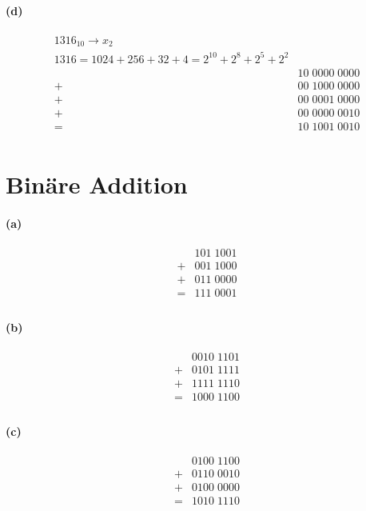 \documentclass[a4paper]{article}
\begin{document}
\paragraph{(d)}
\begin{align*}
    1316_{10}\rightarrow x_2\\
    1316 = 1024+256+32+4=2^{10}+2^8+2^5+2^2\\
    &10\;0000\;0000\\
    +&00\;1000\;0000\\
    +&00\;0001\;0000\\
    +&00\;0000\;0010\\
    =&10\;1001\;0010\\
\end{align*}

\section{Binäre Addition}
\paragraph{(a)}
\begin{align*}
    &101\;1001\\
    +&001\;1000\\
    +&011\;0000\\
    =&111\;0001\\
\end{align*}

\paragraph{(b)}
\begin{align*}
    &0010\;1101\\
    +&0101\;1111\\
    +&1111\;1110\\
    =&1000\;1100\\
\end{align*}

\paragraph{(c)}
\begin{align*}
    &0100\;1100\\
    +&0110\;0010\\
    +&0100\;0000\\
    =&1010\;1110\\
\end{align*}
\end{document}
